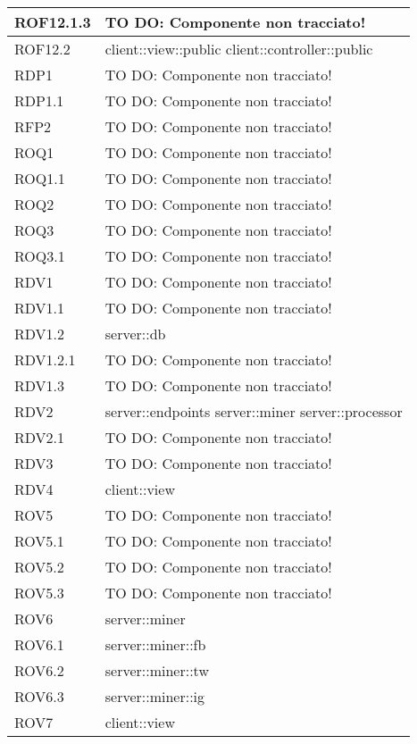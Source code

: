 \begin{center}
\begin{longtable}{| p{4cm} | p{8cm} |}
\hline
ROF12.1.3 & TO DO: Componente non tracciato! \\
\hline
ROF12.2 & client::view::public \newline client::controller::public \\
\hline
RDP1 & TO DO: Componente non tracciato! \\
\hline
RDP1.1 & TO DO: Componente non tracciato! \\
\hline
RFP2 & TO DO: Componente non tracciato! \\
\hline
ROQ1 & TO DO: Componente non tracciato! \\
\hline
ROQ1.1 & TO DO: Componente non tracciato! \\
\hline
ROQ2 & TO DO: Componente non tracciato! \\
\hline
ROQ3 & TO DO: Componente non tracciato! \\
\hline
ROQ3.1 & TO DO: Componente non tracciato! \\
\hline
RDV1 & TO DO: Componente non tracciato! \\
\hline
RDV1.1 & TO DO: Componente non tracciato! \\
\hline
RDV1.2 & server::db \\
\hline
RDV1.2.1 & TO DO: Componente non tracciato! \\
\hline
RDV1.3 & TO DO: Componente non tracciato! \\
\hline
RDV2 & server::endpoints \newline server::miner \newline server::processor \\
\hline
RDV2.1 & TO DO: Componente non tracciato! \\
\hline
RDV3 & TO DO: Componente non tracciato! \\
\hline
RDV4 & client::view \\
\hline
ROV5 & TO DO: Componente non tracciato! \\
\hline
ROV5.1 & TO DO: Componente non tracciato! \\
\hline
ROV5.2 & TO DO: Componente non tracciato! \\
\hline
ROV5.3 & TO DO: Componente non tracciato! \\
\hline
ROV6 & server::miner \\
\hline
ROV6.1 & server::miner::fb \\
\hline
ROV6.2 & server::miner::tw \\
\hline
ROV6.3 & server::miner::ig \\
\hline
ROV7 & client::view \\

\end{longtable}
\end{center}
